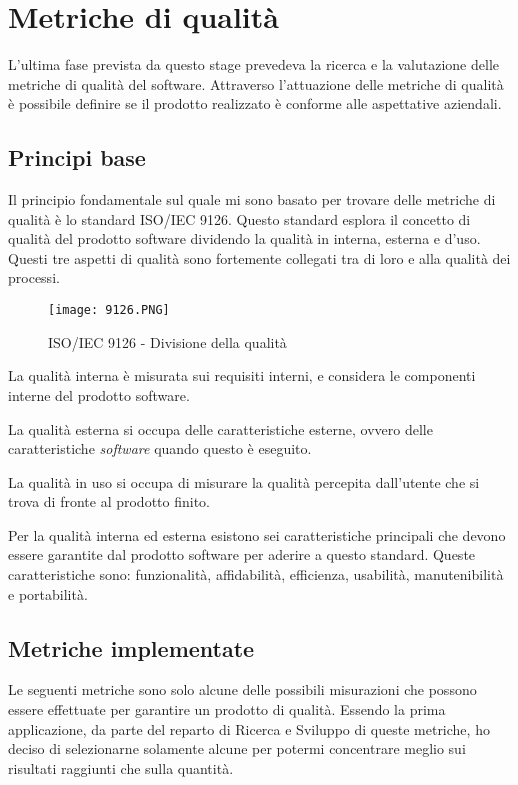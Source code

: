 \section{Metriche di qualità}

L'ultima fase prevista da questo stage prevedeva la ricerca e la valutazione delle metriche di qualità del software.
Attraverso l'attuazione delle metriche di qualità è possibile definire se il prodotto realizzato è conforme alle aspettative aziendali.

\subsection{Principi base}
Il principio fondamentale sul quale mi sono basato per trovare delle metriche di qualità è lo standard ISO/IEC 9126.
Questo standard esplora il concetto di qualità del prodotto software dividendo la qualità in interna, esterna e d'uso. Questi tre aspetti di qualità sono fortemente collegati tra di loro e alla qualità dei processi.

\begin{figure}[H]
  \centering
  \texttt{[image: 9126.PNG]}
  \caption{ISO/IEC 9126 - Divisione della qualità}
\end{figure}

La qualità interna è misurata sui requisiti interni, e considera le componenti interne del prodotto software.

La qualità esterna si occupa delle caratteristiche esterne, ovvero delle caratteristiche \textit{software} quando questo è eseguito.

La qualità in uso si occupa di misurare la qualità percepita dall'utente che si trova di fronte al prodotto finito.

Per la qualità interna ed esterna esistono sei caratteristiche principali che devono essere garantite dal prodotto software per aderire a questo standard. Queste caratteristiche sono: funzionalità, affidabilità, efficienza, usabilità, manutenibilità e portabilità.

\subsection{Metriche implementate}
Le seguenti metriche sono solo alcune delle possibili misurazioni che possono essere effettuate per garantire un prodotto di qualità. Essendo la prima applicazione, da parte del reparto di Ricerca e Sviluppo di queste metriche, ho deciso di selezionarne solamente alcune per potermi concentrare meglio sui risultati raggiunti che sulla quantità.

